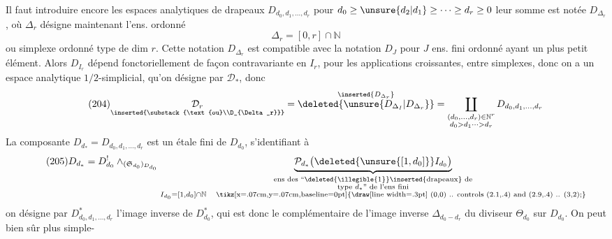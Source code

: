 Il faut introduire encore les espaces analytiques
de drapeaux $D_{d_0,d_1,\ldots,d_r}$ pour $d_0\geq \unsure{d_2|d_1}\geq\cdots\geq d_r\geq0$
leur somme est notée $D_{\Delta_r}$, où $\Delta_r$ désigne
maintenant l'ens. ordonné
\[
\tag{203}\Delta_r=[0,r]\cap\mathbb N
\]
ou simplexe ordonné type de dim $r$. Cette notation
$D_{\Delta_r}$ est compatible avec la notation $D_J$ pour $J$
ens. fini ordonné ayant un plus petit élément.
Alors $D_{I_r}$ dépend fonctoriellement de façon
contravariante en $I_r$, pour les applications
croissantes, entre simplexes, donc on a un
espace analytique $1/2$-simplicial, qu'on désigne par
$\mathcal D_*$, donc
\[
\tag{204}
\underset{\inserted{\substack{\text{ou}\\D_{\Delta_r}}}}{\mathcal D_r}
=\overset{\inserted{D_{\Delta_r}}}{\deleted{\unsure{D_{\Delta_I}|D_{\Delta_r}}}}
=\coprod_{\substack{(d_0,\ldots,d_r)\in\mathbb N^r\\d_0>d_1\cdots>d_r}}
D_{d_0,d_1,\ldots,d_r}
\]
La composante $D_{d_*}=D_{d_0,d_1,\ldots,d_r}$ est
un  étale fini de $D_{d_0}$, s'identifiant
à
\[
\tag{205}
D_{d_*}=D^{!}_{d_0}\wedge_{(\mathfrak S_{d_0})_{D_{d_0}}}
\underbrace{\mathcal P_{d_*}\bigl(\deleted{\unsure{[1,d_0]}}I_{d_0}\bigr)}_{
\substack{\text{ens des ``\deleted{\illegible{1}}\inserted{drapeaux} de}\\
\text{type }d_*\text{'' de l'ens fini}\\
I_{d_0}=[1,d_0]\cap\mathbb N\quad\text{\tikz[x=.07cm,y=.07cm,baseline=0pt]{\draw[line width=.3pt] (0,0) .. controls (2.1,.4) and (2.9,.4) .. (3,2);}}}}
\]
on désigne par $D^*_{d_0,d_1,\ldots,d_r}$ l'image inverse
de $D^*_{d_0}$, qui est donc le complémentaire
de l'image inverse $\Delta_{d_0-d_r}$ du diviseur
$\Theta_{d_0}$ sur $D_{d_0}$. On peut bien sûr plus simple-
